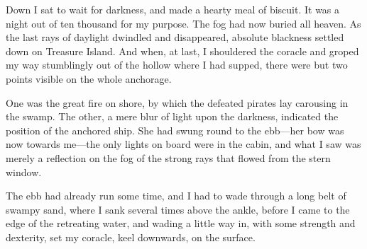 Down I sat to wait for darkness, and made a hearty meal of biscuit. It was a night out of ten thousand for my purpose. The fog had now buried all heaven. As the last rays of daylight dwindled and disappeared, absolute blackness settled down on Treasure Island. And when, at last, I shouldered the coracle and groped my way stumblingly out of the hollow where I had supped, there were but two points visible on the whole anchorage.

One was the great fire on shore, by which the defeated pirates lay carousing in the swamp. The other, a mere blur of light upon the darkness, indicated the position of the anchored ship. She had swung round to the ebb—her bow was now towards me—the only lights on board were in the cabin, and what I saw was merely a reflection on the fog of the strong rays that flowed from the stern window.

The ebb had already run some time, and I had to wade through a long belt of swampy sand, where I sank several times above the ankle, before I came to the edge of the retreating water, and wading a little way in, with some strength and dexterity, set my coracle, keel downwards, on the surface.